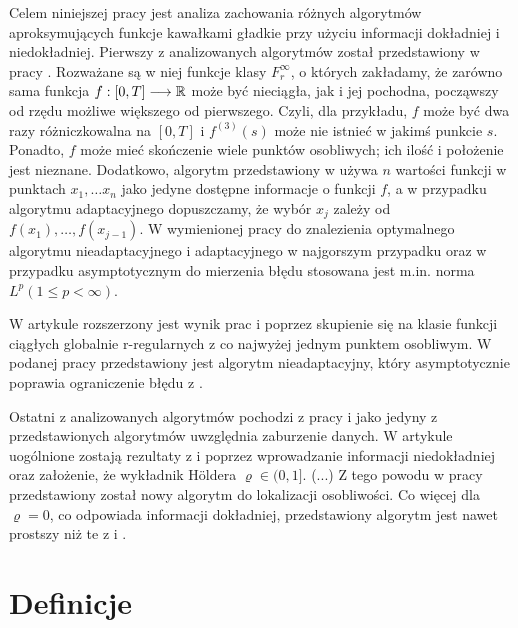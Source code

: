 \documentclass[oik, pdftex, robocza, man]{mgrwms}
\begin{document}
\begin{wstep}    %
    Celem niniejszej pracy jest analiza zachowania różnych algorytmów aproksymujących funkcje kawałkami gładkie przy użyciu informacji dokładniej i niedokładniej.
    Pierwszy z analizowanych algorytmów został przedstawiony w pracy \cite{PoA}. Rozważane są w niej funkcje klasy $F^{\infty}_r$, o których zakładamy, że zarówno sama funkcja $f: [0,T] \longrightarrow \mathbb{R}$ może być nieciągła, jak i jej pochodna, począwszy od rzędu możliwe większego od pierwszego. Czyli, dla przykładu, $f$ może być dwa razy różniczkowalna na $[0, T]$ i $f^{(3)}(s)$ może nie istnieć w jakimś punkcie $s$. Ponadto, $f$ może mieć skończenie wiele punktów osobliwych; ich ilość i położenie jest nieznane. Dodatkowo, algorytm przedstawiony w \cite{PoA} używa $n$ wartości funkcji w punktach $x_1, \ldots x_n$ jako jedyne dostępne informacje o funkcji $f$, a w przypadku algorytmu adaptacyjnego dopuszczamy, że wybór $x_j$ zależy od $f(x_1), \ldots, f(x_{j-1})$.
    W wymienionej pracy do znalezienia optymalnego algorytmu nieadaptacyjnego i adaptacyjnego w najgorszym przypadku oraz w przypadku asymptotycznym do mierzenia błędu stosowana jest m.in. norma $L^p (1 \leq  p < \infty)$.

    W artykule \cite{UA} rozszerzony jest wynik prac \cite{IaA} i \cite{PoA} poprzez skupienie się na klasie funkcji ciągłych globalnie r-regularnych z co najwyżej jednym punktem osobliwym. W podanej pracy przedstawiony jest algorytm nieadaptacyjny, który asymptotycznie poprawia ograniczenie błędu z \cite{AoP}.

    Ostatni z analizowanych algorytmów pochodzi z pracy \cite{AoP} i jako jedyny z przedstawionych algorytmów uwzględnia zaburzenie danych. W artykule uogólnione zostają rezultaty z \cite{PoA} i \cite{UA} poprzez wprowadzanie informacji niedokładniej oraz założenie, że wykładnik Höldera $\varrho \in (0,1]$. (...) Z tego powodu w pracy \cite{AoP} przedstawiony został nowy algorytm do lokalizacji osobliwości. Co więcej dla $\varrho = 0$, co odpowiada informacji dokładniej, przedstawiony algorytm jest nawet prostszy niż te z \cite{PoA} i \cite{UA}.

\end{wstep}



\chapter{Definicje}
\end{document}
